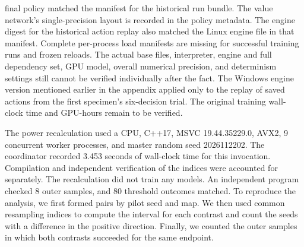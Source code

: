 \documentclass{article}
\begin{document}
final policy matched the manifest for the historical run bundle. The value network's single-precision layout is recorded in the policy metadata. The engine digest for the historical action replay also matched the Linux engine file in that manifest. Complete per-process load manifests are missing for successful training runs and frozen reloads. The actual base files, interpreter, engine and full dependency set, GPU model, overall numerical precision, and determinism settings still cannot be verified individually after the fact. The Windows engine version mentioned earlier in the appendix applied only to the replay of saved actions from the first specimen's six-decision trial. The original training wall-clock time and GPU-hours remain to be verified.


The power recalculation used a CPU, C++17, MSVC 19.44.35229.0, AVX2, 9 concurrent worker processes, and master random seed 2026112202. The coordinator recorded 3.453 seconds of wall-clock time for this invocation. Compilation and independent verification of the indices were accounted for separately. The recalculation did not train any models. An independent program checked 8 outer samples, and 80 threshold outcomes matched. To reproduce the analysis, we first formed pairs by pilot seed and map. We then used common resampling indices to compute the interval for each contrast and count the seeds with a difference in the positive direction. Finally, we counted the outer samples in which both contrasts succeeded for the same endpoint.
\end{document}
